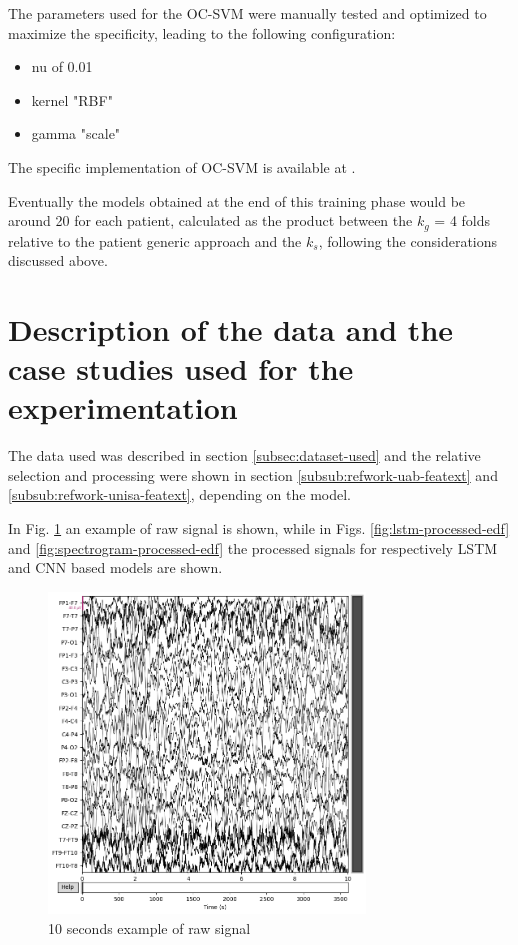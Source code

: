 The parameters used for the \gls{OC-SVM} were manually tested and optimized to maximize the specificity, leading to the following configuration:

\begin{itemize}
    \item nu of 0.01
    \item kernel "\gls{RBF}"
    \item gamma "scale"
\end{itemize}

The specific implementation of \gls{OC-SVM} is available at \cite{noauthor_sklearnsvmoneclasssvm_nodate}.

Eventually the models obtained at the end of this training phase would be around 20 for each patient, calculated as the product between the $k_g$ = 4 folds relative to the patient generic approach and the $k_s$, following the considerations discussed above. 


\section{Description of the data and the case studies used for the experimentation}
The data used was described in section \ref{subsec:dataset-used} and the relative selection and processing were shown in section \ref{subsub:refwork-uab-featext} and \ref{subsub:refwork-unisa-featext}, depending on the model.

In Fig. \ref{fig:raw-edf} an example of raw signal is shown, while in Figs. \ref{fig:lstm-processed-edf} and \ref{fig:spectrogram-processed-edf} the processed signals for respectively \gls{LSTM} and \gls{CNN} based models are shown. 

\begin{figure}[ht]
    \centering
    \includegraphics[width=0.75\textwidth]{images/Experimental-validation/raw-edf.png}
    \caption{10 seconds example of raw signal}
    \label{fig:raw-edf}
\end{figure}

